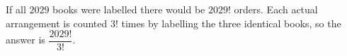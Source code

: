 If all $2029$ books were labelled there would be $2029!$ orders. Each actual arrangement is counted $3!$ times by labelling the three identical books, so the answer is $\boxed{\dfrac{2029!}{3!}}$.
